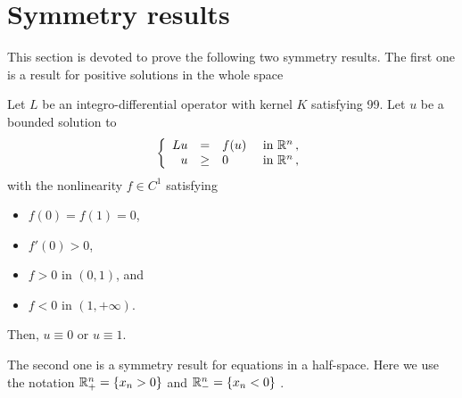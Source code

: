 \section{Symmetry results}
\label{Sec:SymmetryResults}




This section is devoted to prove the following two symmetry results. The first one is a result for positive solutions in the whole space

\begin{theorem}
	\label{Th:SymmetryWholeSpace}
	Let $L$ be an integro-differential operator with kernel $K$ satisfying 99. Let $u$ be a bounded solution to
	\begin{equation}
	\label{Eq:PositiveWholeSpace}
	\left\{\begin{array}{rcll}
	L u &=& f(u) & \textrm{ in }\mathbb{R}^n\,,\\
	u &\geq& 0 & \textrm{ in } \mathbb{R}^n\,,
	\end{array} \right.
	\end{equation}
	with the nonlinearity $f\in C^1$ satisfying
	\begin{itemize}
		\item $f(0) = f(1) = 0$,
		\item $f'(0)>0$,
		\item $f>0$ in $(0,1)$, and
		\item $f<0$ in $(1,+\infty)$.
	\end{itemize}
	Then, $u\equiv 0$ or $u \equiv 1$.
\end{theorem}

The second one is a symmetry result for equations in a half-space. Here we use the notation $\mathbb{R}^n_+ = \{x_n > 0\}$ and $\mathbb{R}^n_- = \{x_n < 0\}$ .

